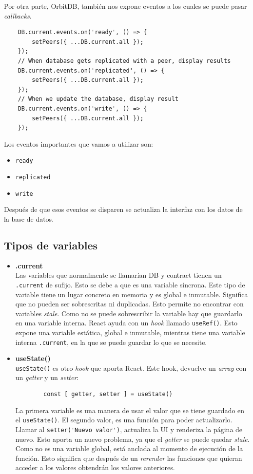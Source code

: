 Por otra parte, OrbitDB, también nos expone eventos a los cuales se puede pasar \textit{callbacks}.
\begin{lstlisting}
    DB.current.events.on('ready', () => {
        setPeers({ ...DB.current.all });
    });
    // When database gets replicated with a peer, display results
    DB.current.events.on('replicated', () => {
        setPeers({ ...DB.current.all });
    });
    // When we update the database, display result
    DB.current.events.on('write', () => {
        setPeers({ ...DB.current.all });
    });
\end{lstlisting}
Los eventos importantes que vamos a utilizar son:
\begin{itemize}
    \item \verb|ready|
    \item \verb|replicated|
    \item \verb|write|
\end{itemize}
Después de que esos eventos se disparen se actualiza la interfaz con los datos de la base de datos.\\
\subsection{Tipos de variables}
\begin{itemize}
    \item \textbf{.current}\\ 
    Las variables que normalmente se llamarían DB y contract tienen un \verb|.current| de sufijo. Esto se debe a que es una variable síncrona. Este tipo de variable tiene un lugar concreto en memoria y es global e inmutable.
    Significa que no pueden ser sobrescritas ni duplicadas. Esto permite no encontrar con variables \textit{stale}. Como no se puede sobrescribir la variable hay que guardarlo en una variable interna.
    React ayuda con un \textit{hook} llamado \verb|useRef()|. Esto expone una variable estática, global e inmutable, mientras tiene una variable interna \verb|.current|, en la que se puede guardar lo que se necesite.
    \item \textbf{useState()}\\
    \verb|useState()| es otro \textit{hook} que aporta React. Este hook, devuelve un \textit{array} con un \textit{getter} y un \textit{setter}:
    \begin{lstlisting}
        const [ getter, setter ] = useState()
    \end{lstlisting}
    La primera variable es una manera de usar el valor que se tiene guardado en el \verb|useState()|. El segundo valor, es una función para poder actualizarlo. Llamar al \verb|setter('Nuevo valor')|, actualiza la UI y renderiza la página de nuevo.
    Esto aporta un nuevo problema, ya que el \textit{getter} se puede quedar \textit{stale}. Como no es una variable global, está anclada al momento de ejecución de la función. Esto significa que después de un \textit{rerender} las funciones que quieran acceder a los valores obtendrán los valores anteriores.\\
\end{itemize}

